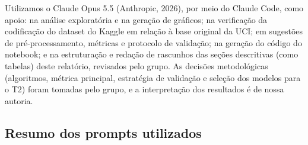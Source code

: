 \documentclass[11pt,letterpaper]{article}
\begin{document}
Utilizamos o Claude Opus 5.5 (Anthropic, 2026), por meio do Claude Code, como apoio: na análise exploratória e na geração de gráficos; na verificação da codificação do dataset do Kaggle em relação à base original da UCI; em sugestões de pré-processamento, métricas e protocolo de validação; na geração do código do notebook; e na estruturação e redação de rascunhos das seções descritivas (como tabelas) deste relatório, revisados pelo grupo. As decisões metodológicas (algoritmos, métrica principal, estratégia de validação e seleção dos modelos para o T2) foram tomadas pelo grupo, e a interpretação dos resultados é de nossa autoria.

\subsection*{Resumo dos prompts utilizados}
\end{document}
